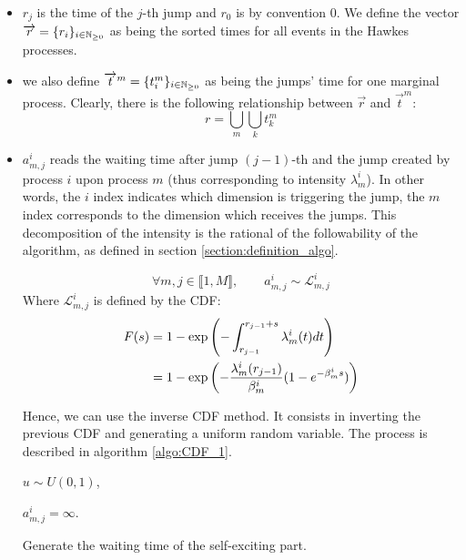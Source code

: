 \begin{itemize}
\item $r_j$ is the time of the $j$-th jump and $r_0$ is by convention $0$. We define the vector $\overrightarrow{r} = \{ r_i \}_{ i \in \mathbb{N}_{\geq 0}}$ as being the sorted times for all events in the Hawkes processes. 
\item we also define $\overrightarrow{t}^m = \{  t_i^m  \}_{ i \in \mathbb{N}_{\geq 0}} $ as being the jumps' time for one marginal process. Clearly, there is the following relationship between $\overrightarrow{r}$ and $\overrightarrow{t}^m $:
$$ r = \bigcup_m \bigcup_k  t_k^m $$
\item $a_{m,j}^i$ reads the waiting time after jump $(j-1)$-th and the jump created by process $i$ upon process $m$ (thus corresponding to intensity $ \lambda^i_m$). In other words, the $i$ index indicates which dimension is triggering the jump, the $m$ index corresponds to the dimension which receives the jumps. This decomposition of the intensity is the rational of the followability of the algorithm, as defined in section \ref{section:definition_algo}.


\begin{remarque}
$$\forall m,j \in  \llbracket 1, M \rrbracket, \qquad a_{m,j}^i \sim \mathcal L_{m,j}^i   $$
Where $\mathcal L_{m,j}^i $ is defined by the CDF:
\begin{align}
F(s) &= 1 - \exp \left ( - \int_{r_{j-1}}^{r_{j-1} + s } \lambda_m^i (t) dt \right ) \notag \\
&= 1 - \exp \left ( - \frac { \lambda^i_m ( r_{j-1} ) } { \beta_m^i } ( 1 - e^{ - \beta_m^i s} ) \right )
\label{eq:L_defined}
\end{align}

Hence, we can use the inverse CDF method. It consists in inverting the previous CDF and generating a uniform random variable. The process is described in algorithm \ref{algo:CDF_1}.
\end{remarque}



\begin{algorithm}[H]
\label{algo:CDF_1}
\SetAlgoLined
$u \sim U(0,1)$,

{$ a ^i_{m,j} = \infty $.}
\caption{Generate the waiting time of the self-exciting part.}
\end{algorithm}



\end{itemize}
